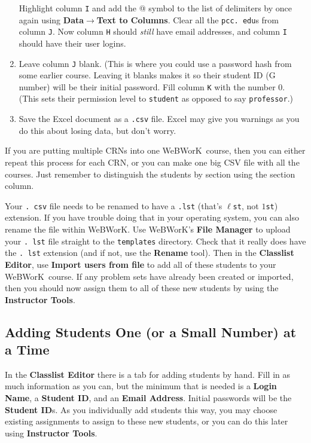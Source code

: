 \documentclass[12pt]{article}
\newcommand{\menu}[1]{\textbf{#1}}
\newcommand{\WW}{WeBWorK}
\begin{document}
\begin{enumerate}
	      Highlight column \texttt{I} and add the @ symbol to the list of delimiters by once again using \menu{Data}$\rightarrow$\menu{Text to Columns}.
	      Clear all the \texttt{pcc.
		      edu}s from column \texttt{J}.
	      Now column \texttt{H} should \emph{still} have email addresses, and column \texttt{I} should have their user logins.
	\item Leave column \texttt{J} blank. (This is where you could use a password hash from some earlier course.
	      Leaving it blanks makes it so their student ID (G number) will be their initial password.
	      Fill column \texttt{K} with the number 0.
	      (This sets their permission level to \texttt{student} as opposed to say \texttt{professor}.)
	\item Save the Excel document as a \texttt{.csv} file.
	      Excel may give you warnings as you do this about losing data, but don't worry.
\end{enumerate}

If you are putting multiple CRNs into one \WW\ course, then you can either repeat this process for each CRN, or you can make one big CSV file with all the courses.
Just remember to distinguish the students by section using the section column.

Your \texttt{.
	csv} file needs to be renamed to have a \texttt{.lst} (that's $\ell$\texttt{st}, not
$1$\texttt{st}) extension.
If you have trouble doing that in your operating system, you can also rename the file within \WW.
Use \WW's \menu{File Manager} to upload your \texttt{.
	lst} file straight to the \texttt{templates} directory.
Check that it really does have the \texttt{.
	lst} extension (and if not, use the \menu{Rename} tool).
Then in the \menu{Classlist Editor}, use \menu{Import users from file} to add all of these students to your \WW\ course.
If any problem sets have already been created or imported, then you should now assign them to all of these new students by using the \menu{Instructor Tools}.

\subsection{Adding Students One (or a Small Number) at a Time}
In the \menu{Classlist Editor} there is a tab for adding students by hand.
Fill in as much information as you can, but the minimum that is needed is a \menu{Login Name}, a \menu{Student ID}, and an \menu{Email Address}.
Initial passwords will be the \menu{Student ID}s.
As you individually add students this way, you may choose existing assignments to assign to these new students, or you can do this later using \menu{Instructor Tools}.
\end{document}
